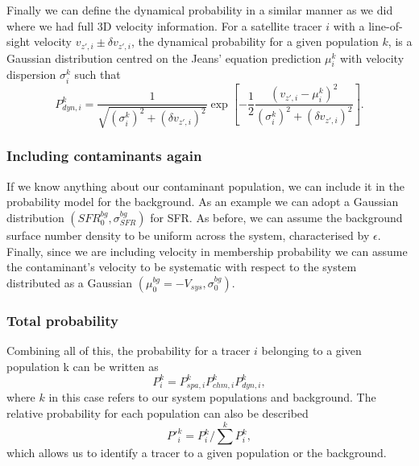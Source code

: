 Finally we can define the dynamical probability in a similar manner as we did where we had full 3D velocity information. For a satellite tracer $i$ with a line-of-sight velocity $v_{z',i} \pm \delta v_{z',i}$, the dynamical probability for a given population $k$, is a Gaussian distribution centred on the Jeans' equation prediction $\mu^k_i$ with velocity dispersion $\sigma^k_i$ such that
\begin{equation}
P^k_{dyn,i} = \frac{1}{\sqrt{(\sigma^k_i)^2+ (\delta v_{z',i})^2}} \exp{\left[-\frac{1}{2}\frac{(v_{z',i}-\mu^k_i)^2}{(\sigma^k_i)^2 + (\delta v_{z',i})^2}\right]}.
\end{equation}
\subsubsection{Including contaminants again}
If we know anything about our contaminant population, we can include it in the probability model for the background. As an example we can adopt a Gaussian distribution $(SFR_0^{bg},\sigma_{SFR}^{bg})$ for SFR. As before, we can assume the background surface number density to be uniform across the system, characterised by $\epsilon$. Finally, since we are including velocity in membership probability we can assume the contaminant's velocity to be systematic with respect to the system distributed as a Gaussian $(\mu_0^{bg}=-V_{sys},\sigma_0^{bg})$. 
\subsubsection{Total probability}
Combining all of this, the probability for a tracer $i$ belonging to a given population k can be written as
\begin{equation}
P_i^{k} = P_{spa,i}^k P_{chm,i}^k P_{dyn,i}^k,
\end{equation}
where $k$ in this case refers to our system populations and background. The relative probability for each population can also be described 
\begin{equation}
P'^k_i = P^k_i / \sum^k P^k_i,
\end{equation}
which allows us to identify a tracer to a given population or the background.

